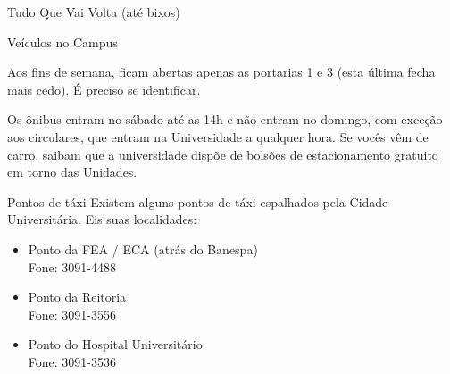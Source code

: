 \begin{secao}{Tudo Que Vai Volta (até bixos)}
\begin{subsecao}{Veículos no Campus}
\begin{itemize}
\end{itemize}

Aos fins de semana, ficam abertas apenas as portarias 1 e 3 (esta última fecha mais cedo). É preciso se identificar.

Os ônibus entram no sábado até as 14h e não entram no domingo, com exceção aos circulares, que entram na Universidade a qualquer hora. Se vocês vêm de carro, saibam que a universidade dispõe de bolsões de estacionamento
gratuito em torno das Unidades.

\end{subsecao}

\begin{subsecao}{Pontos de táxi}
Existem alguns pontos de táxi espalhados pela Cidade Universitária. Eis suas
localidades:

\begin{itemize}
\item Ponto da FEA / ECA (atrás do Banespa)\\
Fone: 3091-4488

\item Ponto da Reitoria\\
Fone: 3091-3556

\item Ponto do Hospital Universitário\\
Fone: 3091-3536
\end{itemize}
\end{subsecao}

\end{secao}
